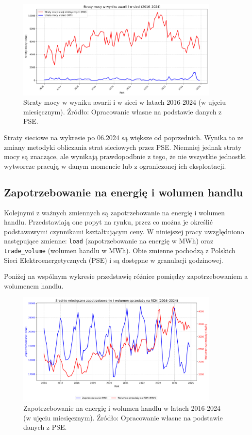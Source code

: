 \begin{figure}[h]
    \centering
    \includegraphics[width=0.9\textwidth]{../plots/losses/power_losses_2016_2024.png}
    \caption{Straty mocy w wyniku awarii i w sieci w latach 2016-2024 (w ujęciu miesięcznym). Źródło: Opracowanie własne na podstawie danych z PSE.}
    \label{fig:power_losses}
\end{figure}

Straty sieciowe na wykresie po 06.2024 są większe od poprzednich. Wynika to ze zmiany metodyki obliczania strat sieciowych przez PSE. Niemniej jednak straty mocy są znaczące, ale wynikają prawdopodbnie z tego, że nie wszystkie jednostki wytworcze pracują w danym momencie lub z ograniczonej ich eksploatacji. 

\subsection{Zapotrzebowanie na energię i wolumen handlu}
\label{subsec:demand}

Kolejnymi z ważnych zmiennych są zapotrzebowanie na energię i wolumen handlu. Przedstawiają one popyt na rynku, przez co można je określić podstawowymi czynnikami kształtującym ceny. W niniejszej pracy uwzględniono następujące zmienne: \texttt{load} (zapotrzebowanie na energię w MWh) oraz \texttt{trade\_volume} (wolumen handlu w MWh). Obie zmienne pochodzą z Polskich Sieci Elektroenergetycznych (PSE) i są dostępne w granulacji godzinowej.

Poniżej na wspólnym wykresie przedstawię różnice pomiędzy zapotrzebowaniem a wolumenem handlu.

\begin{figure}[H]
    \centering
    \includegraphics[width=0.9\textwidth]{../plots/market/load_vs_volume_2016_2024.png}
    \caption{Zapotrzebowanie na energię i wolumen handlu w latach 2016-2024 (w ujęciu miesięcznym). Źródło: Opracowanie własne na podstawie danych z PSE.}
    \label{fig:load_vs_trade_volume}
\end{figure}

